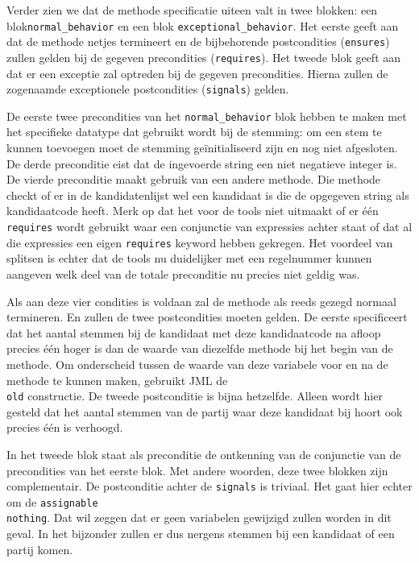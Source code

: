 \documentclass{article}
\begin{document}
Verder zien we dat de methode specificatie uiteen valt in twee blokken: een blok\texttt{normal\_behavior} en een blok \texttt{exceptional\_behavior}.
Het eerste geeft aan dat de methode netjes termineert en de bijbehorende 
postcondities (\texttt{ensures}) zullen gelden bij de gegeven precondities (\texttt{requires}).
Het tweede blok geeft aan dat er een exceptie zal optreden bij de gegeven precondities. Hierna zullen de zogenaamde exceptionele 
postcondities (\texttt{signals}) gelden.

De eerste twee precondities van het \texttt{normal\_behavior} blok hebben te
maken met het specifieke datatype dat gebruikt wordt bij de stemming: om een
stem te kunnen toevoegen moet de stemming ge\"initialiseerd zijn en nog niet
afgesloten. De derde preconditie eist dat de ingevoerde string een niet
negatieve integer is. 
De vierde preconditie maakt gebruik van een andere methode. Die methode
checkt of er in de kandidatenlijst wel een kandidaat is die de opgegeven string
als kandidaatcode heeft.
Merk op dat het voor de tools niet uitmaakt of er \'e\'en \texttt{requires} wordt gebruikt waar een conjunctie van expressies achter staat of dat al die 
expressies een eigen \texttt{requires} keyword hebben gekregen. 
Het voordeel van splitsen is echter dat de tools nu duidelijker met een 
regelnummer kunnen aangeven welk deel van de totale preconditie nu precies
niet geldig was.

Als aan deze vier condities is voldaan zal de methode als reeds gezegd normaal
termineren. En zullen de twee postcondities moeten gelden.
De eerste specificeert dat het aantal stemmen bij de kandidaat met deze
kandidaatcode na afloop precies \'e\'en hoger is dan de waarde van diezelfde
methode bij het begin van de methode. Om onderscheid tussen de waarde van deze
variabele voor en na de methode te kunnen maken, gebruikt JML de \texttt{\\old}
constructie.
De tweede postconditie is bijna hetzelfde. Alleen wordt hier gesteld dat het
aantal stemmen van de partij waar deze kandidaat bij hoort ook precies \'e\'en
is verhoogd.

In het tweede blok staat als preconditie de ontkenning van de conjunctie
van de precondities van het eerste blok. Met andere woorden, deze twee blokken
zijn complementair.
De postconditie achter de \texttt{signals} is triviaal. Het gaat hier echter
om de \texttt{assignable \\nothing}. Dat wil zeggen dat er geen variabelen
gewijzigd zullen worden in dit geval.
In het bijzonder zullen er dus nergens stemmen bij een kandidaat of een partij
komen.



\end{document}

